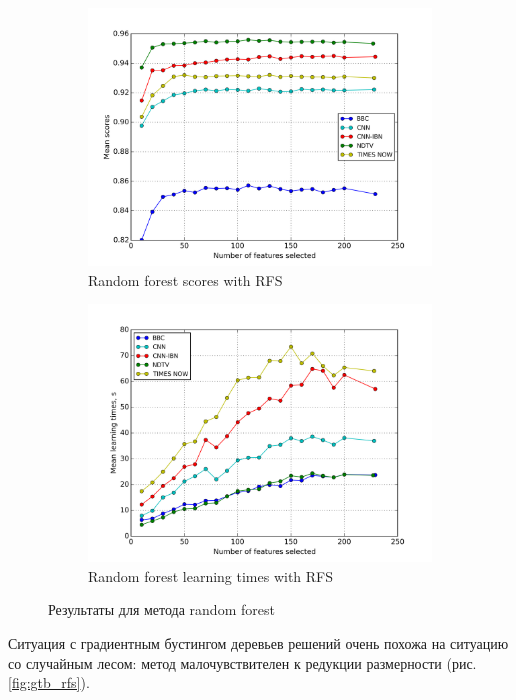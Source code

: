 \begin{figure}[h!]
    \centering
	\begin{subfigure}{0.45\textwidth}
		\includegraphics[width=\textwidth]{images/RFS-randforest.png}
		\caption{Random forest scores with RFS}
	\end{subfigure}
	\begin{subfigure}{0.45\textwidth}
		\includegraphics[width=\textwidth]{images/RFS-randforestTime.png}
		\caption{Random forest learning times with RFS}
	\end{subfigure}
	\caption{Результаты для метода random forest}\label{fig:randfor_rfs}
\end{figure} 

\par
Ситуация с градиентным бустингом деревьев решений очень похожа на ситуацию со случайным лесом: метод малочувствителен к редукции размерности (рис. \ref{fig:gtb_rfs}).

